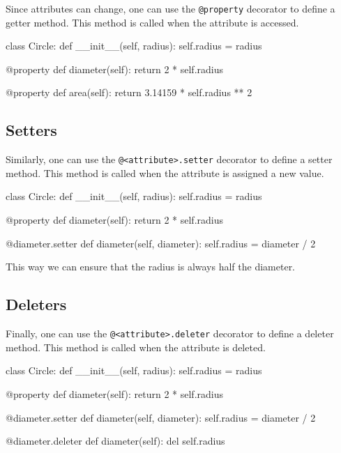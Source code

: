 Since attributes can change, one can use the \texttt{@property} decorator to define a getter method. This method is called when the attribute is accessed.

\begin{codeblock}[language=Python]
class Circle:
    def __init__(self, radius):
        self.radius = radius

    @property
    def diameter(self):
        return 2 * self.radius

    @property
    def area(self):
        return 3.14159 * self.radius ** 2
\end{codeblock}

\subsection*{Setters}

Similarly, one can use the \texttt{@<attribute>.setter} decorator to define a setter method. This method is called when the attribute is assigned a new value.

\begin{codeblock}[language=Python]
class Circle:
    def __init__(self, radius):
        self.radius = radius

    @property
    def diameter(self):
        return 2 * self.radius

    @diameter.setter
    def diameter(self, diameter):
        self.radius = diameter / 2
\end{codeblock}

This way we can ensure that the radius is always half the diameter.

\subsection*{Deleters}

Finally, one can use the \texttt{@<attribute>.deleter} decorator to define a deleter method. This method is called when the attribute is deleted.

\begin{codeblock}[language=Python]
class Circle:
    def __init__(self, radius):
        self.radius = radius

    @property
    def diameter(self):
        return 2 * self.radius

    @diameter.setter
    def diameter(self, diameter):
        self.radius = diameter / 2

    @diameter.deleter
    def diameter(self):
        del self.radius
\end{codeblock}


